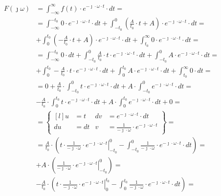 \begin{task}
\begin{align*}
F(\jmath \omega )&=\int_{-\infty }^{\infty}f(t) \cdot e^{-\jmath \cdot \omega \cdot t}\cdot dt=\\ %
&=\int_{-\infty}^{-t_{0}} 0 \cdot e^{-\jmath \cdot \omega \cdot t}\cdot dt %
+\int_{-t_{0}}^{0} \left(\frac{A}{t_{0}} \cdot t + A\right) \cdot e^{-\jmath \cdot \omega \cdot t}\cdot dt=\\
&+\int_{0}^{t_{0}} \left(-\frac{A}{t_{0}} \cdot t + A\right) \cdot e^{-\jmath \cdot \omega \cdot t}\cdot dt
+\int_{t_{0}}^{\infty} 0 \cdot e^{-\jmath \cdot \omega \cdot t}\cdot dt=\\
&=\int_{-\infty}^{-t_{0}} 0 \cdot dt +\int_{-t_{0}}^{0}\frac{A}{t_{0}} \cdot t \cdot e^{-\jmath \cdot \omega \cdot t}\cdot dt %
+\int_{-t_{0}}^{0}A \cdot e^{-\jmath \cdot \omega \cdot t}\cdot dt=\\
&+\int_{0}^{t_{0}} -\frac{A}{t_{0}} \cdot t \cdot e^{-\jmath \cdot \omega \cdot t}\cdot dt 
+\int_{0}^{t_{0}} A \cdot e^{-\jmath \cdot \omega \cdot t}\cdot dt + \int_{t_{0}}^{\infty} 0 \cdot dt=\\
&= 0  + \frac{A}{t_{0}} \cdot \int_{-t_{0}}^{0} t \cdot e^{-\jmath \cdot \omega \cdot t}\cdot dt %
+A \cdot \int_{-t_{0}}^{0} e^{-\jmath \cdot \omega \cdot t}\cdot dt=\\
&-\frac{A}{t_{0}} \cdot \int_{0}^{t_{0}} t \cdot e^{-\jmath \cdot \omega \cdot t}\cdot dt 
+A \cdot \int_{0}^{t_{0}} e^{-\jmath \cdot \omega \cdot t}\cdot dt + 0=\\
&=\begin{Bmatrix*}[l] %
u&=t & dv&=e^{ -\jmath \cdot \omega \cdot t} \cdot dt \\
du&=dt & v&=\frac{1}{-\jmath \cdot \omega}\cdot e^{ -\jmath \cdot \omega \cdot t}
\end{Bmatrix*}=\\
&=\frac{A}{t_{0}}\cdot \left( \left. t \cdot \frac{1}{-\jmath \cdot \omega}\cdot e^{ -\jmath \cdot \omega \cdot t} \right|_{-t_{0}}^{0} %
- \int_{-t_{0}}^{0} \frac{1}{-\jmath \cdot \omega}\cdot e^{ -\jmath \cdot \omega \cdot t} \cdot dt \right)=\\
&+ A\cdot \left( \left. \frac{1}{-\jmath \cdot \omega}\cdot e^{ -\jmath \cdot \omega \cdot t} \right|_{-t_{0}}^{0}\right)=\\
&-\frac{A}{t_{0}}\cdot \left( \left. t \cdot \frac{1}{-\jmath \cdot \omega}\cdot e^{ -\jmath \cdot \omega \cdot t} \right|_{0}^{t_{0}}
- \int_{0}^{t_{0}} \frac{1}{-\jmath \cdot \omega}\cdot e^{ -\jmath \cdot \omega \cdot t} \cdot dt \right)=\\

\end{align*}
\end{task}

